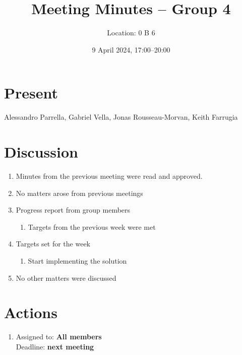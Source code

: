 \documentclass{cce2014-meetings}
\title{Meeting Minutes -- Group 4}
\author{Location: 0 B 6}
\date{9 April 2024, 17:00--20:00}
\begin{document}
\maketitle

\section*{Present}
Alessandro Parrella,
Gabriel Vella,
Jonas Rousseau-Morvan,
Keith Farrugia

\section*{Discussion}

\begin{enumerate}


      \item Minutes from the previous meeting were read and approved.

      \item No matters arose from previous meetings

      \item Progress report from group members
            \begin{enumerate}
                  \item Targets from the previous week were met 
            \end{enumerate}

      \item Targets set for the week
            \begin{enumerate}
                  \item Start implementing the solution 
            \end{enumerate}
            
      \item No other matters were discussed
\end{enumerate}

\section*{Actions}

\begin{enumerate}

      \item 
            \begin{flushright}
                  Assigned to: \textbf{All members} \\
                  Deadline: \textbf{next meeting}
            \end{flushright}


\end{enumerate}
\end{document}
